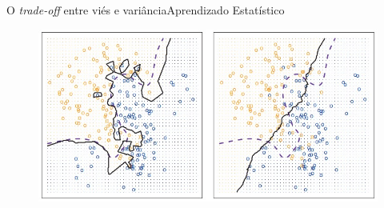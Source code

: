 \documentclass[t]{beamer}
\begin{document}

\begin{ftst}{O \textit{trade-off} entre viés e variância}{{Aprendizado Estatístico}}


\begin{figure}
    \centering
    \includegraphics[scale=0.4]{Figuras/slide03_13.jpg}
\end{figure}

\end{ftst}

\end{document}
